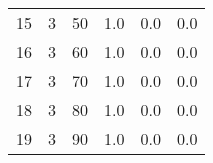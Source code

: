 \documentclass{article}
\begin{document}
{\begin{tabular}{llllll}
15 &         3 &         50 &              1.0 &                       0.0 &                                   0.0 \\
16 &         3 &         60 &              1.0 &                       0.0 &                                   0.0 \\
17 &         3 &         70 &              1.0 &                       0.0 &                                   0.0 \\
18 &         3 &         80 &              1.0 &                       0.0 &                                   0.0 \\
19 &         3 &         90 &              1.0 &                       0.0 &                                   0.0 \\
\bottomrule
\end{tabular}
}
\newpage
\end{document}
